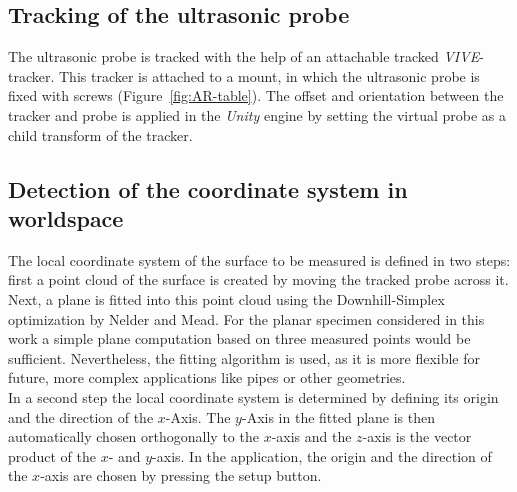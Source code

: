 \documentclass{VRARWorkshop}
\begin{document}
\subsection{Tracking of the ultrasonic probe}
The ultrasonic probe is tracked with the help of an attachable tracked \textit{VIVE}-tracker.
This tracker is attached to a mount, in which the ultrasonic probe is fixed with screws (Figure~\ref{fig:AR-table}).
The offset and orientation between the tracker and probe is applied in the \textit{Unity} engine by setting the virtual probe as a child transform of the tracker.

\subsection{Detection of the coordinate system in worldspace}
The local coordinate system of the surface to be measured is defined in two steps:
first a point cloud of the surface is created by moving the tracked probe across it.
Next, a plane is fitted into this point cloud using the Downhill-Simplex optimization by Nelder and Mead.
For the planar specimen considered in this work a simple plane computation based on three measured points would be sufficient.
Nevertheless, the fitting algorithm is used, as it is more flexible for future, more complex applications like pipes or other geometries.\\
In a second step the local coordinate system is determined by defining its origin and the direction of the $x$-Axis.
The $y$-Axis in the fitted plane is then automatically chosen orthogonally to the $x$-axis and the $z$-axis is the vector product of the $x$- and $y$-axis.
In the application, the origin and the direction of the $x$-axis are chosen by pressing the setup button.
\end{document}
